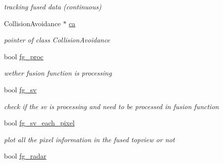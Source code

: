 \begin{DoxyCompactItemize}
\begin{DoxyCompactList}\small\item\em tracking fused data (continuous) \end{DoxyCompactList}\item 
\hypertarget{class_sensor_info_af9aa110890f48a9bd2cd44e960c3ef60}{}Collision\+Avoidance $\ast$ \hyperlink{class_sensor_info_af9aa110890f48a9bd2cd44e960c3ef60}{ca}\label{class_sensor_info_af9aa110890f48a9bd2cd44e960c3ef60}

\begin{DoxyCompactList}\small\item\em pointer of class Collision\+Avoidance \end{DoxyCompactList}\item 
\hypertarget{class_sensor_info_a1970954c71534f432c13165864a3efca}{}bool \hyperlink{class_sensor_info_a1970954c71534f432c13165864a3efca}{fg\+\_\+proc}\label{class_sensor_info_a1970954c71534f432c13165864a3efca}

\begin{DoxyCompactList}\small\item\em wether fusion function is processing \end{DoxyCompactList}\item 
\hypertarget{class_sensor_info_a207a7b13dd2fe49ca4a5cd7f5c183004}{}bool \hyperlink{class_sensor_info_a207a7b13dd2fe49ca4a5cd7f5c183004}{fg\+\_\+sv}\label{class_sensor_info_a207a7b13dd2fe49ca4a5cd7f5c183004}

\begin{DoxyCompactList}\small\item\em check if the sv is processing and need to be processed in fusion function \end{DoxyCompactList}\item 
\hypertarget{class_sensor_info_af0b67a69fa0c2d346b8f0e4b72f7d84f}{}bool \hyperlink{class_sensor_info_af0b67a69fa0c2d346b8f0e4b72f7d84f}{fg\+\_\+sv\+\_\+each\+\_\+pixel}\label{class_sensor_info_af0b67a69fa0c2d346b8f0e4b72f7d84f}

\begin{DoxyCompactList}\small\item\em plot all the pixel information in the fused topview or not \end{DoxyCompactList}\item 
\hypertarget{class_sensor_info_aa526e31c8b20b439088564a9b2bb86e9}{}bool \hyperlink{class_sensor_info_aa526e31c8b20b439088564a9b2bb86e9}{fg\+\_\+radar}\label{class_sensor_info_aa526e31c8b20b439088564a9b2bb86e9}


\end{DoxyCompactItemize}

